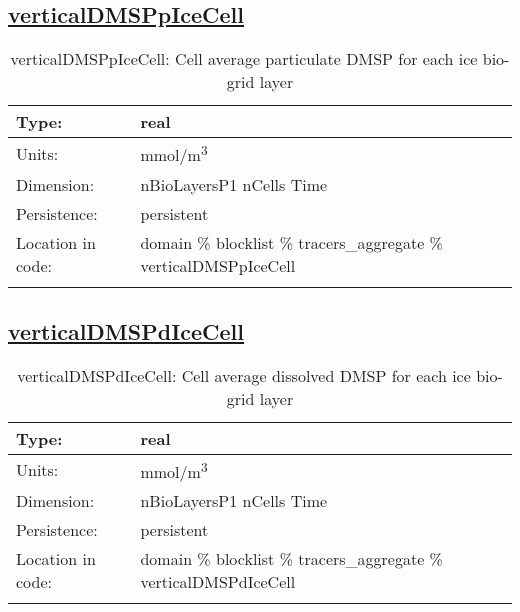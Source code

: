 \subsection[verticalDMSPpIceCell]{\hyperref[sec:var_tab_tracers_aggregate]{verticalDMSPpIceCell}}
\label{subsec:var_sec_tracers_aggregate_verticalDMSPpIceCell}
\begin{center}
\begin{longtable}{| p{2.0in} | p{4.0in} |}
        \hline 
        Type: & real \\
        \hline 
        Units: & \si{mmol/m^3} \\
        \hline 
        Dimension: & nBioLayersP1 nCells Time \\
        \hline 
        Persistence: & persistent \\
        \hline 
         Location in code: & domain \% blocklist \% tracers\_aggregate \% verticalDMSPpIceCell \\
         \hline 
    \caption{verticalDMSPpIceCell: Cell average particulate DMSP for each ice bio-grid layer}
\end{longtable}
\end{center}
\subsection[verticalDMSPdIceCell]{\hyperref[sec:var_tab_tracers_aggregate]{verticalDMSPdIceCell}}
\label{subsec:var_sec_tracers_aggregate_verticalDMSPdIceCell}
\begin{center}
\begin{longtable}{| p{2.0in} | p{4.0in} |}
        \hline 
        Type: & real \\
        \hline 
        Units: & \si{mmol/m^3} \\
        \hline 
        Dimension: & nBioLayersP1 nCells Time \\
        \hline 
        Persistence: & persistent \\
        \hline 
         Location in code: & domain \% blocklist \% tracers\_aggregate \% verticalDMSPdIceCell \\
         \hline 
    \caption{verticalDMSPdIceCell: Cell average dissolved DMSP for each ice bio-grid layer}
\end{longtable}
\end{center}
